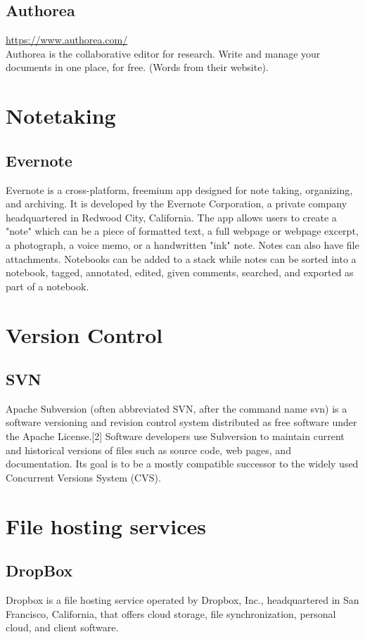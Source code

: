\documentclass{article}
\begin{document}
\subsection{Authorea}
\href{https://www.authorea.com/}{https://www.authorea.com/}\\
Authorea is the collaborative editor for research. Write and manage your documents in one place, for free. (Words from their website).

\section{Notetaking}
\subsection{Evernote}
Evernote is a cross-platform, freemium app designed for note taking, organizing, and archiving. It is developed by the Evernote Corporation, a private company headquartered in Redwood City, California. The app allows users to create a "note" which can be a piece of formatted text, a full webpage or webpage excerpt, a photograph, a voice memo, or a handwritten "ink" note. Notes can also have file attachments. Notebooks can be added to a stack while notes can be sorted into a notebook, tagged, annotated, edited, given comments, searched, and exported as part of a notebook.

\section{Version Control}
\subsection{SVN}
Apache Subversion (often abbreviated SVN, after the command name svn) is a software versioning and revision control system distributed as free software under the Apache License.[2] Software developers use Subversion to maintain current and historical versions of files such as source code, web pages, and documentation. Its goal is to be a mostly compatible successor to the widely used Concurrent Versions System (CVS).

\section{File hosting services}
\subsection{DropBox}
Dropbox is a file hosting service operated by Dropbox, Inc., headquartered in San Francisco, California, that offers cloud storage, file synchronization, personal cloud, and client software.
\end{document}
